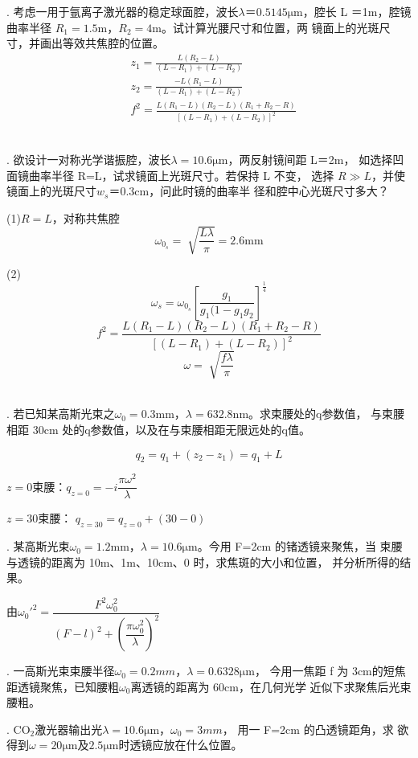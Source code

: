 \documentclass[12pt]{article}
\begin{document}
{. 考虑一用于氩离子激光器的稳定球面腔，波长$\lambda＝0.5145\si{\um}$，腔长 L
＝1m，腔镜曲率半径 $R_1=1.5$m，$R_2=4$m。试计算光腰尺寸和位置，两
镜面上的光斑尺寸，并画出等效共焦腔的位置。
}
{\kaishu\noindent
\begin{align*}
	&z_1=\frac{L(R_2-L)}{(L-R_1)+(L-R_2)} 
\\	&z_2=\frac{-L(R_1-L)}{(L-R_1)+(L-R_2)} 
\\	&f^2=\frac{L(R_1-L)(R_2-L)(R_1+R_2-R)}{[(L-R_1)+(L-R_2)]^2} 
\end{align*}
\\}

{. 欲设计一对称光学谐振腔，波长$\lambda=10.6\si{\um}$，两反射镜间距 L＝2m，
如选择凹面镜曲率半径 R=L，试求镜面上光斑尺寸。若保持 L 不变，
选择 $R \gg L$，并使镜面上的光斑尺寸$w_s$＝0.3cm，问此时镜的曲率半
径和腔中心光斑尺寸多大？
}
{\kaishu\noindent
	\par (1)$R=L$，对称共焦腔
	\[
		\omega_{0_s}=\sqrt[]{\dfrac{L\lambda}{\pi} }=2.6\si{\mm}
	\]
	\par (2)
	\[
		\omega_s=\omega_{0_s}\left[ \dfrac{g_1}{g_1(1-g_1g_2}  \right] ^{\frac{1}{4} }
	\]
	\[
	f^2=\frac{L(R_1-L)(R_2-L)(R_1+R_2-R)}{[(L-R_1)+(L-R_2)]^2} 
	\]
	\[
		\omega=\sqrt[]{\dfrac{f\lambda}{\pi} }
	\]
\\}

{. 若已知某高斯光束之$\omega_0=0.3$mm，$\lambda=632.8\si{\nm}$。求束腰处的q参数值，
与束腰相距 30cm 处的q参数值，以及在与束腰相距无限远处的q值。
}
{\kaishu\noindent
	\[
		q_2=q_1+(z_2-z_1)=q_1+L
	\]
	\par $z=0$束腰：$q_{z=0}=-i \dfrac{\pi\omega^2}{\lambda} $
	\par $z=30$束腰： $q_{z=30}=q_{z=0}+(30-0)$
\\}


{. 某高斯光束$\omega_0=1.2$mm，$\lambda=10.6\si{\um}$。今用 F=2cm 的锗透镜来聚焦，当
束腰与透镜的距离为 10m、1m、10cm、0 时，求焦斑的大小和位置，
并分析所得的结果。
}
{\kaishu\noindent
	\par 由$\omega_0'^2=\dfrac{F^2\omega_0^2}{(F-l)^2+\left( \dfrac{\pi\omega_0^2}{\lambda}  \right) ^2} $
\\}

{. 一高斯光束束腰半径$\omega_0=0.2\si{mm}$，$\lambda=0.6328\si{\um}$，
今用一焦距 f 为 3cm的短焦距透镜聚焦，已知腰粗$\omega_0$离透镜的距离为 60cm，在几何光学
近似下求聚焦后光束腰粗。
}

{. CO$_2$激光器输出光$\lambda=10.6\si{\um}$，$\omega_0=3\si{mm}$，
	用一 F=2cm 的凸透镜距角，求
	欲得到$\omega=20\si{\um}$及$2.5\si{\um}$时透镜应放在什么位置。
}
\end{document}
